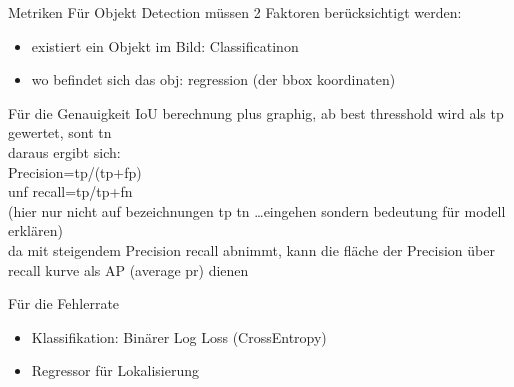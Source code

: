 \begin{frame}{Metriken}
    Für Objekt Detection müssen 2 Faktoren berücksichtigt werden:
    \begin{itemize}
        \item existiert ein Objekt im Bild: Classificatinon
        \item wo befindet sich das obj: regression (der bbox koordinaten)
    \end{itemize}
    \begin{block}{Für die Genauigkeit}
        IoU berechnung plus graphig, ab best thresshold wird als tp gewertet, sont tn\\
        daraus ergibt sich:\\
        Precision=tp/(tp+fp)\\
        unf recall=tp/tp+fn\\
        (hier nur nicht auf bezeichnungen tp tn \dots eingehen sondern bedeutung für modell erklären)
        \\
        da mit steigendem Precision recall abnimmt, kann die fläche der Precision über recall kurve als AP (average pr) dienen 

    \end{block}
    \begin{block}{Für die Fehlerrate}
        \begin{itemize}
            \item Klassifikation: Binärer Log Loss (CrossEntropy)
            \item Regressor für Lokalisierung
        \end{itemize}
    \end{block}
\end{frame}


